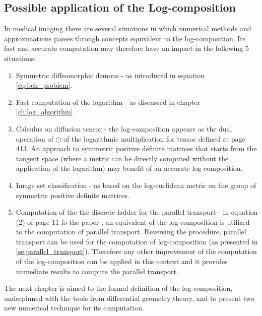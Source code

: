 \subsection{Possible application of the Log-composition}
In medical imaging there are several situations in which numerical methods and approximations passes through concepts equivalent to the log-composition.
Its fast and accurate computation may therefore have an impact in the following $5$ situations:
\begin{enumerate}
	\item Symmetric diffeomorphic demons \cite{vercauteren08} - as introduced in equation \ref{eq:bch_problem}.
	\item Fast computation of the logarithm \cite{Bossa:08} - as discussed in chapter \ref{ch:log_algorithm}.
	\item Calculus on diffusion tensor \cite{Arsigny:MRM:06} - the log-composition appears as the dual operation of $\odot$ of the logarithmic multiplication for tensor defined at page 413. An approach to symmetric positive definite matrices that starts from the tangent space (where a metric can be directly computed without the application of the logarithm) may benefit of an accurate log-composition.  
	\item Image set classification \cite{huanglog} - as based on the log-euclidean metric on the group of symmetric positive definite matrices.
	\item Computation of the the discrete ladder for the parallel transport - in equation (2) of page $11$ fo the paper \cite{Lorenzi:discrete_ladders:14}, an equivalent of the log-composition is utilized to the computation of parallel transport. Reversing the procedure, parallel transport can be used for the computation of log-composition (as presented in \ref{se:parallel_transport}). Therefore any other improvement of the computation of the log-composition can be applied in this context and it provides immediate results to compute the parallel transport.
\end{enumerate}	
	
The next chapter is aimed to the formal definition of the log-composition, underpinned with the tools from differential geometry theory, and to present two new numerical technique for its computation.







